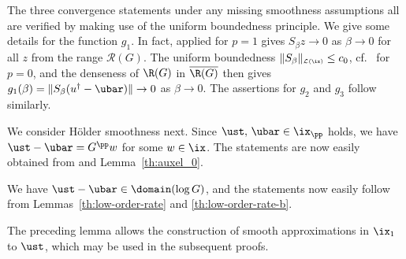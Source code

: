 \documentclass[10pt]{article}
\theoremstyle{definition}
\begin{document}
\begin{mylist}
\item
The three convergence statements under any missing smoothness assumptions all are verified by making use of the uniform boundedness principle.
We give some details for the function $ g_1 $.
In fact,  applied for $ p = 1 $ gives
$S_\beta z \to 0$ as $\beta \to 0$ for all $z$ from the range
$\mathcal{R}(G)$.
The uniform boundedness $\|S_\beta\|_{\scriptscriptstyle \mathcal{L}(\ix)} \le c_0$, cf.~ for $ p = 0 $,
and the denseness of $ \R(G) $ in  $\overline{\R(G)}$ then gives
$g_1(\beta)=\|S_\beta (u^\dagger-\ubar )\| \to 0$ as $\beta \to
0$.
The assertions for $g_2$ and $g_3$ follow similarly.

\item We consider H\"older smoothness next. Since $ \ust, \, \ubar \in \ix_\pp $ holds, we have $ \ust - \ubar = G^{\pp}w $ for some $ w \in \ix $.
The statements are now easily obtained from  and
Lemma~\ref{th:auxel_0}.

\item
We have $ \ust - \ubar \in \domain(\log G) $, and the statements now easily follow from
Lemmas~\ref{th:low-order-rate} and \ref{th:low-order-rate-b}.

%
\proofend
\end{mylist}
%
The preceding lemma allows the construction of smooth approximations in $ \ix_1 $ to $ \ust $, which may be used in the subsequent proofs.
%
\end{document}
